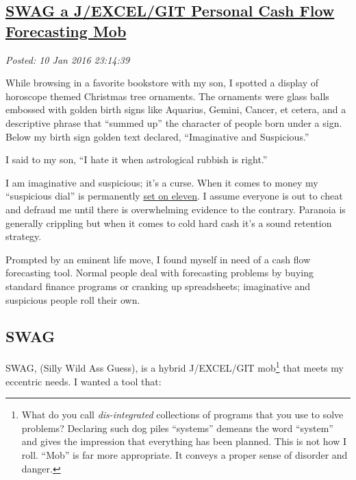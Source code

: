 %

\subsection*{\href{https://bakerjd99.wordpress.com/2016/01/10/swag-a-jexcelgit-personal-cash-flow-forecasting-mob/}{SWAG a J/EXCEL/GIT Personal Cash Flow Forecasting Mob}}

\noindent\emph{Posted: 10 Jan 2016 23:14:39}
\vspace{6pt}

While browsing in a favorite bookstore with my son, I spotted a display
of horoscope themed Christmas tree ornaments. The ornaments were glass
balls embossed with golden birth signs like Aquarius, Gemini, Cancer, et
cetera, and a descriptive phrase that ``summed up'' the character of
people born under a sign. Below my birth sign golden text declared,
``Imaginative and Suspicious.''

I said to my son, ``I hate it when astrological rubbish is right.''

I am imaginative and suspicious; it's a curse. When it comes to money my
``suspicious dial'' is permanently
\href{https://www.youtube.com/watch?v=4xgx4k83zzc}{set on eleven}. I
assume everyone is out to cheat and defraud me until there is
overwhelming evidence to the contrary. Paranoia is generally crippling
but when it comes to cold hard cash it's a sound retention strategy.

Prompted by an eminent life move, I found myself in need of a cash flow
forecasting tool. Normal people deal with forecasting problems by buying
standard finance programs or cranking up spreadsheets; imaginative and
suspicious people roll their own.

\subsection*{SWAG}\label{swag}

SWAG, (Silly Wild Ass Guess), is a hybrid J/EXCEL/GIT mob\footnote{What
  do you call \emph{dis-integrated} collections of programs that you use
  to solve problems? Declaring such dog piles ``systems'' demeans the
  word ``system'' and gives the impression that everything has been
  planned. This is not how I roll. ``Mob'' is far more appropriate. It
  conveys a proper sense of disorder and danger.} that meets my
eccentric needs. I wanted a tool that:

